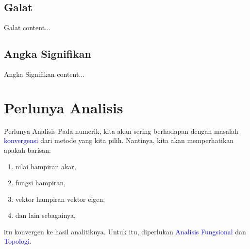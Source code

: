 \documentclass[xcolor={dvipsnames}, 9pt]{beamer}
\renewcommand{\emph}[1]{\textcolor{Blue}{#1}}
\begin{document}
	\subsection{Galat}
	\begin{frame}{Galat}
		content...
	\end{frame}
	\subsection{Angka Signifikan}
	\begin{frame}{Angka Signifikan}
		content...
	\end{frame}
	\section{Perlunya Analisis}
	\begin{frame}{Perlunya Analisis}
		Pada numerik, kita akan sering berhadapan dengan masalah \emph{konvergensi} dari metode yang kita pilih. \newline
		Nantinya, kita akan memperhatikan apakah barisan:
		\begin{enumerate}
			\item nilai hampiran akar,
			\item fungsi hampiran,
			\item vektor hampiran vektor eigen,
			\item dan lain sebagainya,
		\end{enumerate}
		itu konvergen ke hasil analitiknya. Untuk itu, diperlukan \emph{Analisis Fungsional} dan \emph{Topologi}.
	\end{frame}
\end{document}
